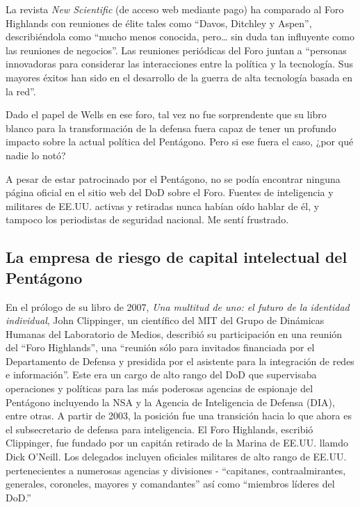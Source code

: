 \documentclass[10pt,a5paper,twoside,spanish,]{book}
\begin{document}
La revista \emph{New Scientific} (de acceso web mediante pago) ha
comparado al Foro Highlands con reuniones de élite tales como ``Davos,
Ditchley y Aspen'', describiéndola como ``mucho menos conocida,
pero\ldots{} sin duda tan influyente como las reuniones de negocios''.
Las reuniones periódicas del Foro juntan a ``personas innovadoras para
considerar las interacciones entre la política y la tecnología. Sus
mayores éxitos han sido en el desarrollo de la guerra de alta tecnología
basada en la red''.

Dado el papel de Wells en ese foro, tal vez no fue sorprendente que su
libro blanco para la transformación de la defensa fuera capaz de tener
un profundo impacto sobre la actual política del Pentágono. Pero si ese
fuera el caso, ¿por qué nadie lo notó?

A pesar de estar patrocinado por el Pentágono, no se podía encontrar
ninguna página oficial en el sitio web del DoD sobre el Foro. Fuentes de
inteligencia y militares de EE.UU. activas y retiradas nunca habían oído
hablar de él, y tampoco los periodistas de seguridad nacional. Me sentí
frustrado.

\subsection{La empresa de riesgo de capital intelectual del
Pentágono}\label{la-empresa-de-riesgo-de-capital-intelectual-del-pentuxe1gono}

En el prólogo de su libro de 2007, \emph{Una multitud de uno: el futuro
de la identidad individual}, John Clippinger, un científico del MIT del
Grupo de Dinámicas Humanas del Laboratorio de Medios, describió su
participación en una reunión del ``Foro Highlands'', una ``reunión sólo
para invitados financiada por el Departamento de Defensa y presidida por
el asistente para la integración de redes e información''. Este era un
cargo de alto rango del DoD que supervisaba operaciones y políticas para
las más poderosas agencias de espionaje del Pentágono incluyendo la NSA
y la Agencia de Inteligencia de Defensa (DIA), entre otras. A partir de
2003, la posición fue una transición hacia lo que ahora es el
subsecretario de defensa para inteligencia. El Foro Highlands, escribió
Clippinger, fue fundado por un capitán retirado de la Marina de EE.UU.
llamdo Dick O'Neill. Los delegados incluyen oficiales militares de alto
rango de EE.UU. pertenecientes a numerosas agencias y divisiones -
``capitanes, contraalmirantes, generales, coroneles, mayores y
comandantes'' así como ``miembros líderes del DoD.''
\end{document}
